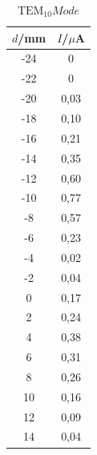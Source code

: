 \begin{table}[H]
	\begin{center}
		\begin{tabular}{c c}
			\toprule
			\(d\)/mm & \(I\)/\(\mu\)A \\
			\midrule
			-24     &0\\
			-22     &0\\
			-20     &0,03\\
			-18     &0,10\\
			-16     &0,21\\
			-14     &0,35\\
			-12     &0,60\\
			-10     &0,77\\
			-8      &0,57\\
			-6      &0,23\\
			-4      &0,02\\
			-2      &0,04\\
			0       &0,17\\
			2       &0,24\\
			4       &0,38\\
			6       &0,31\\
			8       &0,26\\
			10     & 0,16\\
			12      &0,09\\
			14      &0,04\\
			\bottomrule
		\end{tabular}
		\caption{\(\text{TEM}_{10} Mode\)}
		\label{fig:t5}
	\end{center}
\end{table}